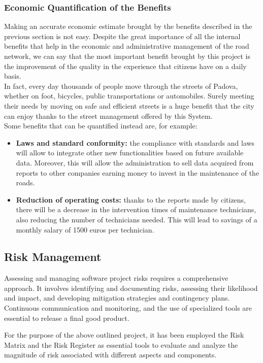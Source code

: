 \subsubsection{Economic Quantification of the Benefits}
Making an accurate economic estimate brought by the benefits described in the previous section is not easy. Despite the great importance of all the internal benefits that help in the economic and administrative management of the road network, we can say that the most important benefit brought by this project is the improvement of the quality in the experience that citizens have on a daily basis. \\ In fact, every day thousands of people move through the streets of Padova, whether on foot, bicycles, public transportations or automobiles. Surely meeting their needs by moving on safe and efficient streets is a huge benefit that the city can enjoy thanks to the street management offered by this System.\\
Some benefits that can be quantified instead are, for example:
\begin{itemize}
    \item \textbf{Laws and standard conformity:} the compliance with standards and laws will allow to integrate other new functionalities based on future available data. Moreover, this will allow the administration to sell data acquired from reports to other companies earning money to invest in the maintenance of the roads.
    \item \textbf{Reduction of operating costs:} thanks to the reports made by citizens, there will be a decrease in the intervention times of maintenance technicians, also reducing the number of technicians needed. This will lead to savings of a monthly salary of 1500 euros per technician.
\end{itemize}

\subsection{Risk Management}
Assessing and managing software project risks requires a comprehensive approach. It involves identifying and documenting risks, assessing their likelihood and impact, and developing mitigation strategies and contingency plans. Continuous communication and  monitoring, and the use of specialized tools are essential to release a final good product.


For the purpose of the above outlined project, it has been employed the Risk Matrix and the Risk Register as essential tools to evaluate and analyze the magnitude of risk associated with different aspects and components.

